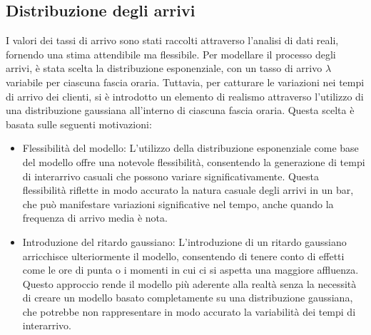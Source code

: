 \documentclass[a4paper, 12pt]{article}
\begin{document}
\subsection{Distribuzione degli arrivi}
I valori dei tassi di arrivo sono stati raccolti attraverso l'analisi di dati reali, fornendo una stima attendibile ma flessibile. Per modellare il processo degli arrivi, è stata scelta la distribuzione esponenziale, con un tasso di arrivo $\lambda$ variabile per ciascuna fascia oraria. Tuttavia, per catturare le variazioni nei tempi di arrivo dei clienti, si è introdotto un elemento di realismo attraverso l'utilizzo di una distribuzione gaussiana all'interno di ciascuna fascia oraria. Questa scelta è basata sulle seguenti motivazioni:
\begin{itemize}
\item Flessibilità del modello: L'utilizzo della distribuzione esponenziale come base del modello offre una notevole flessibilità, consentendo la generazione di tempi di interarrivo casuali che possono variare significativamente. Questa flessibilità riflette in modo accurato la natura casuale degli arrivi in un bar, che può manifestare variazioni significative nel tempo, anche quando la frequenza di arrivo media è nota.

\item Introduzione del ritardo gaussiano: L'introduzione di un ritardo gaussiano arricchisce ulteriormente il modello, consentendo di tenere conto di effetti come le ore di punta o i momenti in cui ci si aspetta una maggiore affluenza. Questo approccio rende il modello più aderente alla realtà senza la necessità di creare un modello basato completamente su una distribuzione gaussiana, che potrebbe non rappresentare in modo accurato la variabilità dei tempi di interarrivo.
\end{itemize}



\end{document}
